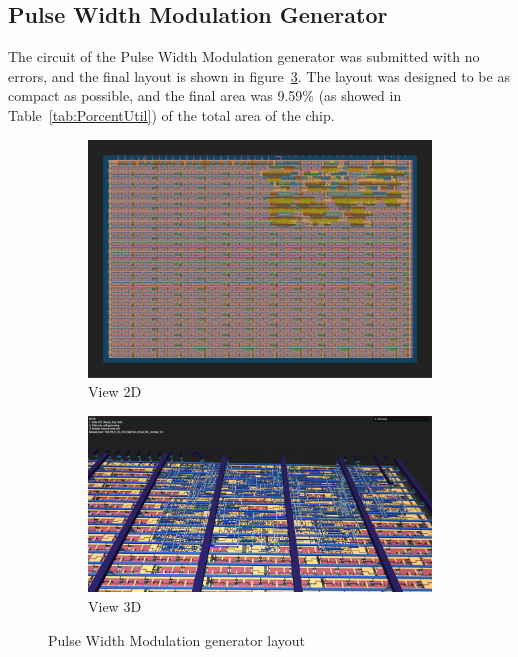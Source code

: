 \subsection{Pulse Width Modulation Generator}

The circuit of the Pulse Width Modulation generator was submitted with no errors, and the final layout is shown in figure\ \ref{fig:PWM}. The layout was designed to be as compact as possible, and the final area was 9.59\% (as showed in Table\ \ref*{tab:PorcentUtil}) of the total area of the chip.

\begin{figure}[H]
    \centering
    \begin{subfigure}[b]{0.45\textwidth}
        \includegraphics[width=\linewidth]{Pictures/Result_PWM_2D_View.png}
        \caption{View 2D}\label{fig:PWM_2D}
    \end{subfigure}
    \begin{subfigure}[b]{0.45\textwidth}
        \includegraphics[width=\linewidth]{Pictures/Result_PWM_3D_View.png}
        \caption{View 3D}\label{fig:PWM_3D}
    \end{subfigure}
    \caption{Pulse Width Modulation generator layout}\label{fig:PWM}
\end{figure}

